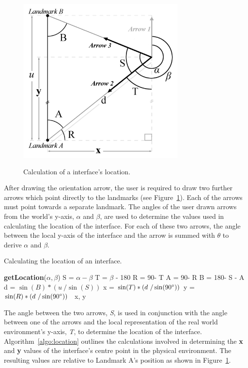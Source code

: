 \documentclass{bmcart}
\newcommand{\INDSTATE}[1][1]{\STATE\hspace{#1\algorithmicindent}}
\begin{document}
\begin{figure}[h]
   \centering
   \caption{Calculation of a interface's location.}
   \includegraphics[width=0.75\textwidth]{figures/trig-illustration.png}
   \label{fig:trig}
\end{figure}

After drawing the orientation arrow, the user is required to draw two further arrows which point directly to the landmarks (see Figure~\ref{fig:trig}).
Each of the arrows must point towards a separate landmark.
The angles of the user drawn arrows from the world's y-axis, $\alpha$ and $\beta$, are used to determine the values used in calculating the location of the interface.
For each of these two arrows, the angle between the local y-axis of the interface and the arrow is summed with $\theta$ to derive $\alpha$ and $\beta$.

\begin{algorithm}[h]
\caption{Calculating the location of an interface.}
\label{algo:location}
\begin{algorithmic}
\STATE \textbf{getLocation}(${\alpha}, {\beta}$)
\INDSTATE[2] S = $\alpha - \beta$
\INDSTATE[2] T = $\beta$ - 180\degree
\INDSTATE[2] R = 90\degree - T
\INDSTATE[2] A = 90\degree - R
\INDSTATE[2] B = 180\degree - S - A
\INDSTATE[2] d = $\sin (B) * (u\ / \sin (S))$
\INDSTATE[2] x = $\sin (T) * (d\ / \sin (90\degree))$
\INDSTATE[2] y = $\sin (R) * (d\ / \sin (90\degree))$
\ x, y
\end{algorithmic}
\end{algorithm}

The angle between the two arrows, {\emph{S}}, is used in conjunction with the angle between one of the arrows and the local representation of the real world environment's y-axis, {\emph{T}}, to determine the location of the interface.
Algorithm~\ref{algo:location} outlines the calculations involved in determining the \textbf{x} and \textbf{y} values of the interface's centre point in the physical environment.
The resulting values are relative to Landmark A's position as shown in Figure~\ref{fig:trig}.
\end{document}
